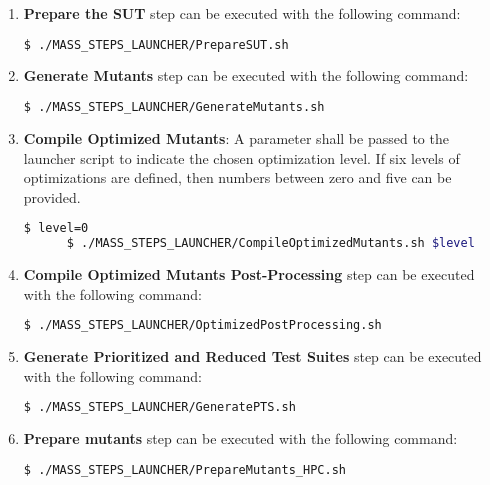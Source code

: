 \begin{enumerate}
	\item \textbf{Prepare the SUT} step can be executed with the following command:

	\begin{lstlisting}[language=bash]
	  $ ./MASS_STEPS_LAUNCHER/PrepareSUT.sh
\end{lstlisting}

	\item \textbf{Generate Mutants} step can be executed with the following command:

	\begin{lstlisting}[language=bash]
	  $ ./MASS_STEPS_LAUNCHER/GenerateMutants.sh
\end{lstlisting}

	\item \textbf{Compile Optimized Mutants}: 
	A parameter shall be passed to the launcher script to indicate the chosen optimization level. If six levels of optimizations are defined, then numbers between zero and five can be provided.

	\begin{lstlisting}[language=bash]
	  $ level=0
	  $ ./MASS_STEPS_LAUNCHER/CompileOptimizedMutants.sh $level
\end{lstlisting}

	\item \textbf{Compile Optimized Mutants Post-Processing} step can be executed with the following command:

	\begin{lstlisting}[language=bash]
	  $ ./MASS_STEPS_LAUNCHER/OptimizedPostProcessing.sh
\end{lstlisting}

	\item \textbf{Generate Prioritized and Reduced Test Suites} step can be executed with the following command:

	\begin{lstlisting}[language=bash]
	  $ ./MASS_STEPS_LAUNCHER/GeneratePTS.sh
\end{lstlisting}

	\item \textbf{Prepare mutants} step can be executed with the following command:

	\begin{lstlisting}[language=bash]
	  $ ./MASS_STEPS_LAUNCHER/PrepareMutants_HPC.sh
\end{lstlisting}


\end{enumerate}
